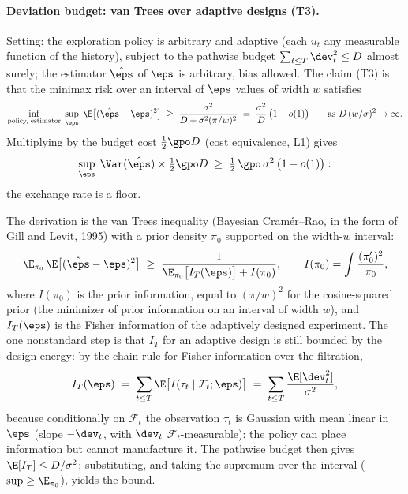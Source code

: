 \paragraph{Deviation budget: van Trees over adaptive designs (T3).}
Setting: the exploration policy is arbitrary and adaptive (each $u_t$ any
measurable function of the history), subject to the pathwise budget
$\sum_{t\le T}\dev_t^2 \le D$ almost surely; the estimator $\hat\eps$ of
$\eps$ is arbitrary, bias allowed. The claim (T3) is that the minimax risk
over an interval of $\eps$ values of width $w$ satisfies
\begin{equation*}
\inf_{\text{policy, estimator}}\;\sup_{\eps}\;
\E\big[(\hat\eps-\eps)^2\big]
\;\ge\; \frac{\sigma^2}{D+\sigma^2(\pi/w)^2}
\;=\; \frac{\sigma^2}{D}\,\big(1-o(1)\big)
\qquad\text{as } D\,(w/\sigma)^2\to\infty .
\end{equation*}
Multiplying by the budget cost $\tfrac{1}{2}\gpo D$ (cost equivalence, L1)
gives
\begin{equation*}
\sup_{\eps}\;\Var(\hat\eps)\times\tfrac{1}{2}\gpo D
\;\ge\; \tfrac{1}{2}\,\gpo\,\sigma^2\,\big(1-o(1)\big):
\end{equation*}
the exchange rate is a floor.

The derivation is the van Trees inequality (Bayesian Cram\'er--Rao, in the
form of Gill and Levit, 1995) with a prior density $\pi_0$ supported on the
width-$w$ interval:
\begin{equation*}
\E_{\pi_0}\,\E\big[(\hat\eps-\eps)^2\big]
\;\ge\; \frac{1}{\E_{\pi_0}\big[I_T(\eps)\big] + I(\pi_0)},
\qquad
I(\pi_0)=\int \frac{(\pi_0')^2}{\pi_0},
\end{equation*}
where $I(\pi_0)$ is the prior information, equal to $(\pi/w)^2$ for the
cosine-squared prior (the minimizer of prior information on an interval of
width $w$), and $I_T(\eps)$ is the Fisher information of the adaptively
designed experiment. The one nonstandard step is that $I_T$ for an adaptive
design is still bounded by the design energy: by the chain rule for Fisher
information over the filtration,
\begin{equation*}
I_T(\eps)
\;=\; \sum_{t\le T}\E\big[I(\tau_t \mid \mathcal{F}_t;\eps)\big]
\;=\; \sum_{t\le T}\frac{\E[\dev_t^2]}{\sigma^2},
\end{equation*}
because conditionally on $\mathcal{F}_t$ the observation $\tau_t$ is Gaussian
with mean linear in $\eps$ (slope $-\dev_t$, with $\dev_t$
$\mathcal{F}_t$-measurable): the policy can place information but cannot
manufacture it. The pathwise budget then gives $\E[I_T]\le D/\sigma^2$;
substituting, and taking the supremum over the interval
($\sup \ge \E_{\pi_0}$), yields the bound.

